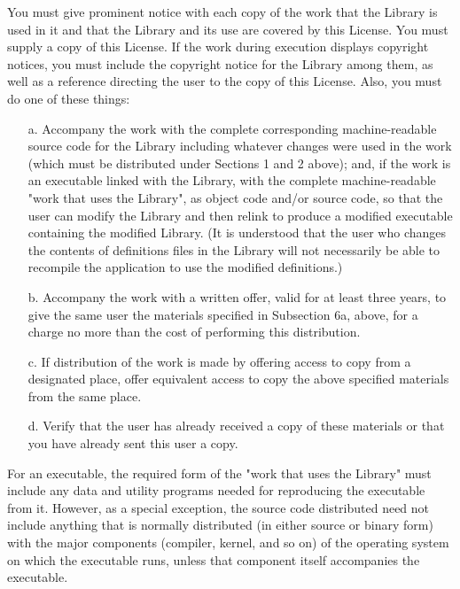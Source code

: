 \begin{enumerate}
  You must give prominent notice with each copy of the work that the
Library is used in it and that the Library and its use are covered by
this License.  You must supply a copy of this License.  If the work
during execution displays copyright notices, you must include the
copyright notice for the Library among them, as well as a reference
directing the user to the copy of this License.  Also, you must do one
of these things:

\begin{enumerate}
\item[a.]  Accompany the work with the complete corresponding
  machine-readable source code for the Library including whatever
  changes were used in the work (which must be distributed under
  Sections 1 and 2 above); and, if the work is an executable linked
  with the Library, with the complete machine-readable "work that uses
  the Library", as object code and/or source code, so that the user
  can modify the Library and then relink to produce a modified
  executable containing the modified Library.  (It is understood that
  the user who changes the contents of definitions files in the
  Library will not necessarily be able to recompile the application to
  use the modified definitions.)

\item[b.] Accompany the work with a written offer, valid for at
    least three years, to give the same user the materials
    specified in Subsection 6a, above, for a charge no more
    than the cost of performing this distribution.

\item[c.] If distribution of the work is made by offering access to copy
    from a designated place, offer equivalent access to copy the above
    specified materials from the same place.

\item[d.] Verify that the user has already received a copy of these
    materials or that you have already sent this user a copy.
\end{enumerate}

  For an executable, the required form of the "work that uses the
Library" must include any data and utility programs needed for
reproducing the executable from it.  However, as a special exception,
the source code distributed need not include anything that is normally
distributed (in either source or binary form) with the major
components (compiler, kernel, and so on) of the operating system on
which the executable runs, unless that component itself accompanies
the executable.


\end{enumerate}
